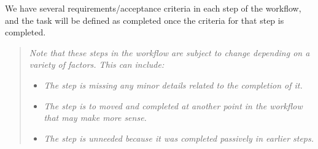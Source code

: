 \documentclass[a4]{article}
\begin{document}
We have several requirements/acceptance criteria in each step of the workflow, and the task will be defined as completed once the criteria for that step is completed.
\begin{quote}
	
\textit{Note that these steps in the workflow are subject to change depending on a variety of factors. This can include:}
	\begin{itemize}
		\item \textit{The step is missing any minor details related to the completion of it.}
		\item \textit{The step is to moved and completed at another point in the workflow that may make more sense.}
		\item \textit{The step is unneeded because it was completed passively in earlier steps.}  
	\end{itemize}

\end{quote}
\end{document}
